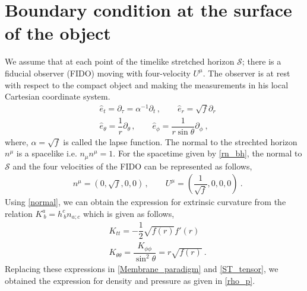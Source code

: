 \documentclass[aps,prd,twocolumn,floatfix,noshowpacs,tightenlines,noshowkeys,superscriptaddress,amsmath,amssymb,
nofootinbib]{revtex4-1}
\renewcommand\[{\begin{equation}}
\renewcommand\]{\end{equation}}
\begin{document}
\section{Boundary condition at the surface of the object}\label{App_RN_perturb}

We assume that at each point of the timelike stretched horizon $\mathcal{S}$; there is a fiducial observer (FIDO) moving with four-velocity $U^\mu$. The observer is at rest with respect to the compact object and making the measurements in his local Cartesian coordinate system. 
\begin{equation}\label{local_coordinate}
	\begin{aligned}
	&\hat{e}_t=\partial_\tau=\alpha^{-1}\partial_t\,,\qquad\hat{e}_r=\sqrt{f}\partial_r\\
&\hat{e}_\theta=\dfrac{1}{r}\partial_\theta\,,\qquad\hat{e}_\phi=\dfrac{1}{r\sin\theta}\partial_\phi~,
	\end{aligned}
\end{equation}
where, $\alpha=\sqrt{f}$ is called the lapse function. The normal to the strechted horizon  $n^\mu$ is a spacelike i.e. $n_\mu n^\mu=1$. For the spacetime given by \autoref{rn_bh}, the normal to $\mathcal{S}$ and the four velocities of the FIDO can be represented as follows, 
\begin{eqnarray}\label{normal}
	&n^\mu=(0,\sqrt{f},0,0)\,,\qquad U^\mu=(\dfrac{1}{\sqrt{f}},0,0,0)~.
\end{eqnarray}
Using \autoref{normal}, we can obtain the expression for extrinsic curvature from the relation $K^a_{~b}=h^c_{~b}n_{a;c}$ which is given as follows, 
\begin{equation}\label{extrinsic_curveture}
	\begin{aligned}
	&K_{tt}=-\dfrac{1}{2}\sqrt{f(r)}f'(r)\\& K_{\theta\theta}=\dfrac{K_{\phi\phi}}{\sin^2\theta}=r\sqrt{f(r)}~.
	\end{aligned}
\end{equation}
Replacing these expressions in \autoref{Membrane_paradigm} and \autoref{ST_tensor}, we obtained the expression for density and pressure as given in \autoref{rho_p}.
\end{document}
